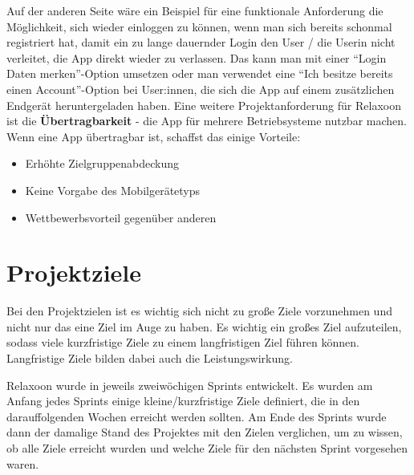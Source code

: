 Auf der anderen Seite wäre ein Beispiel für eine funktionale Anforderung die Möglichkeit, sich wieder einloggen zu
können, wenn man sich bereits schonmal registriert hat, damit ein zu lange dauernder Login den User / die Userin
nicht verleitet, die App direkt wieder zu verlassen. Das kann man mit einer "`Login Daten merken"'-Option umsetzen
oder man verwendet eine "`Ich besitze bereits einen Account"'-Option bei User:innen, die sich die App auf einem
zusätzlichen Endgerät heruntergeladen haben. Eine weitere Projektanforderung für Relaxoon ist die
\textbf{Übertragbarkeit} - die App für mehrere Betriebsysteme nutzbar machen. Wenn eine App übertragbar ist,
schaffst das einige Vorteile:
\begin{itemize}
      \item Erhöhte Zielgruppenabdeckung
      \item Keine Vorgabe des Mobilgerätetyps
      \item Wettbewerbsvorteil gegenüber anderen
\end{itemize}

\section{Projektziele}


Bei den Projektzielen ist es wichtig sich nicht zu große Ziele vorzunehmen und nicht nur das eine Ziel im Auge zu haben.
Es wichtig ein großes Ziel aufzuteilen, sodass viele kurzfristige Ziele zu einem langfristigen Ziel führen können.
Langfristige Ziele bilden dabei auch die Leistungswirkung.

Relaxoon wurde in jeweils zweiwöchigen Sprints entwickelt. Es wurden am Anfang jedes Sprints einige 
kleine/kurzfristige Ziele definiert, die in den darauffolgenden Wochen erreicht werden sollten. Am Ende des 
Sprints wurde dann der damalige Stand des Projektes mit den Zielen verglichen, um zu wissen, ob alle Ziele 
erreicht wurden und welche Ziele für den nächsten Sprint vorgesehen waren.


